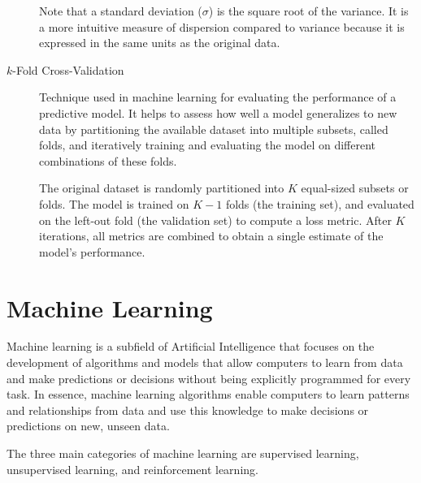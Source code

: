 \documentclass[a4paper]{report}
\begin{document}
\begin{description}
Note that a standard deviation ($\sigma$) is the square root of the variance. It is a more intuitive measure of dispersion compared to variance because it is expressed in the same units as the original data.

\item[$k$-Fold Cross-Validation]
Technique used in machine learning for evaluating the performance of a predictive model. It helps to assess how well a model generalizes to new data by partitioning the available dataset into multiple subsets, called folds, and iteratively training and evaluating the model on different combinations of these folds.

The original dataset is randomly partitioned into $K$ equal-sized subsets or folds. The model is trained on $K-1$ folds (the training set), and evaluated on the left-out fold (the validation set) to compute a loss metric. After $K$ iterations, all metrics are combined to obtain a single estimate of the model's performance.

\end{description}

\section{Machine Learning}
Machine learning is a subfield of Artificial Intelligence that focuses on the development of algorithms and models that allow computers to learn from data and make predictions or decisions without being explicitly programmed for every task. In essence, machine learning algorithms enable computers to learn patterns and relationships from data and use this knowledge to make decisions or predictions on new, unseen data.

The three main categories of machine learning are supervised learning, unsupervised learning, and reinforcement learning.
\end{document}
